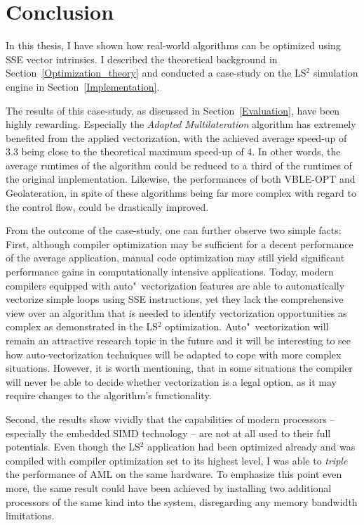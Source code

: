 \section{Conclusion}
\label{Conclusion}
In this thesis, I have shown how real-world algorithms can be optimized using SSE vector intrinsics. I described the theoretical background in Section~\ref{Optimization_theory} and conducted a case-study on the LS$^{2}$ simulation engine in Section~\ref{Implementation}.

The results of this case-study, as discussed in Section~\ref{Evaluation}, have been highly rewarding. Especially the \emph{Adapted Multilateration} algorithm has extremely benefited from the applied vectorization, with the achieved average speed-up of 3.3 being close to the theoretical maximum speed-up of 4. In other words, the average runtimes of the algorithm could be reduced to a third of the runtimes of the original implementation. Likewise, the performances of both VBLE-OPT and Geolateration, in spite of these algorithms being far more complex with regard to the control flow, could be drastically improved.

From the outcome of the case-study, one can further observe two simple facts: First, although compiler optimization may be sufficient for a decent performance of the average application, manual code optimization may still yield significant performance gains in computationally intensive applications. Today, modern compilers equipped with auto"~vectorization features are able to automatically vectorize simple loops using SSE instructions, yet they lack the comprehensive view over an algorithm that is needed to identify vectorization opportunities as complex as demonstrated in the LS$^{2}$ optimization. Auto"~vectorization will remain an attractive research topic in the future and it will be interesting to see how auto-vectorization techniques will be adapted to cope with more complex situations. However, it is worth mentioning, that in some situations the compiler will never be able to decide whether vectorization is a legal option, as it may require changes to the algorithm's functionality.

Second, the results show vividly that the capabilities of modern processors -- especially the embedded SIMD technology -- are not at all used to their full potentials. Even though the LS$^{2}$ application had been optimized already and was compiled with compiler optimization set to its highest level, I was able to \emph{triple} the performance of AML on the same hardware. To emphasize this point even more, the same result could have been achieved by installing two additional processors of the same kind into the system, disregarding any memory bandwidth limitations. 

